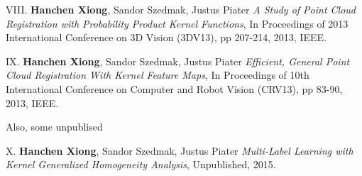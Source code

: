 \begin{shaded}
  {\Huge VIII.} \textbf{Hanchen Xiong}, Sandor Szedmak, Justus Piater {\it A Study of Point Cloud Registration with Probability Product Kernel Functions}, 
In Proceedings of 2013 International Conference on 3D Vision (3DV13), pp 207-214,  2013, IEEE.
\vspace{-.2cm}

 {\Huge IX.} \textbf{Hanchen Xiong}, Sandor Szedmak, Justus Piater {\it Efficient, General Point Cloud Registration With Kernel Feature Maps}, 
In Proceedings of 10th International Conference on Computer and Robot Vision (CRV13), pp 83-90, 2013, IEEE.

\vspace{-.2cm}
\end{shaded}
Also, some unpublised 
\begin{shaded}
 {\Huge X.} \textbf{Hanchen Xiong}, Sandor Szedmak, Justus Piater {\it Multi-Label Learning with Kernel Generalized Homogeneity Analysis}, 
Unpublished, 2015.
\end{shaded}
